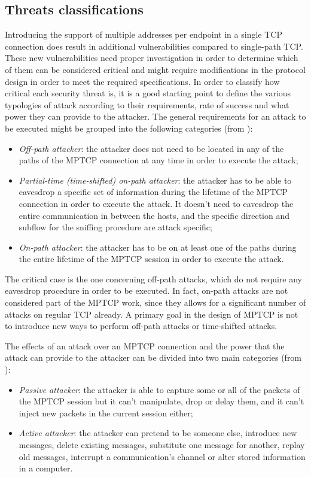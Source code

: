 \subsection{Threats classifications}
Introducing the support of multiple addresses per endpoint in a single TCP connection does result in additional vulnerabilities compared to single-path TCP. These new vulnerabilities need proper investigation in order to determine which of them can be considered critical and might require modifications in the protocol design in order to meet the required specifications. In order to classify how critical each security threat is, it is a good starting point to define the various typologies of attack according to their requirements, rate of success and what power they can provide to the attacker.
The general requirements for an attack to be executed might be grouped into the following categories (from ):

\begin{itemize}  
\item \textit{Off-path attacker}: the attacker does not need to be located in any of the paths of the MPTCP connection at any time in order to execute the attack;
\item \textit{Partial-time (time-shifted) on-path attacker}: the attacker has to be able to eavesdrop a specific set of information during the lifetime of the MPTCP connection in order to execute the attack. It doesn't need to eavesdrop the entire communication in between the hosts, and the specific direction and subflow for the sniffing procedure are attack specific;
\item \textit{On-path attacker}: the attacker has to be on at least one of the paths during the entire lifetime of the MPTCP session in order to execute the attack.
\end{itemize}

The critical case is the one concerning off-path attacks, which do not require any eavesdrop procedure in order to be executed. In fact, on-path attacks are not considered part of the MPTCP work, since they allows for a significant number of attacks on regular TCP already. A primary goal in the design of MPTCP is not to introduce new ways to perform off-path attacks or time-shifted attacks.

The effects of an attack over an MPTCP connection and the power that the attack can provide to the attacker can be divided into two main categories (from ):

\begin{itemize}  
\item \textit{Passive attacker}: the attacker is able to capture some or all of the packets of the MPTCP session but it can't manipulate, drop or delay them, and it can't inject new packets in the current session either;
\item \textit{Active attacker}: the attacker can pretend to be someone else, introduce new messages, delete existing messages, substitute one message for another, replay old messages, interrupt a communication's channel or alter stored information in a computer.
\end{itemize}


